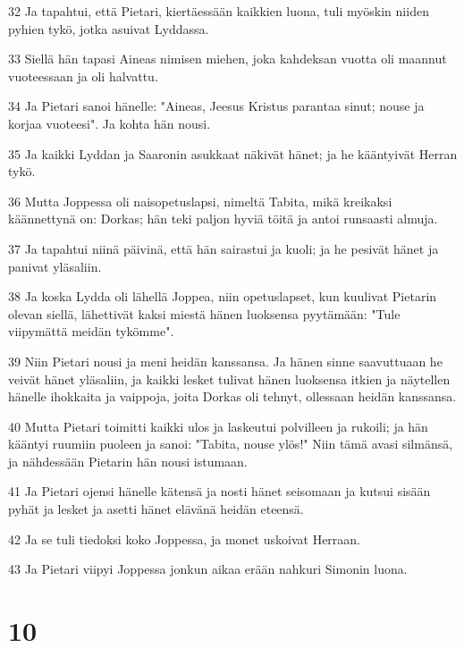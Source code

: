 \par 32 Ja tapahtui, että Pietari, kiertäessään kaikkien luona, tuli myöskin niiden pyhien tykö, jotka asuivat Lyddassa.
\par 33 Siellä hän tapasi Aineas nimisen miehen, joka kahdeksan vuotta oli maannut vuoteessaan ja oli halvattu.
\par 34 Ja Pietari sanoi hänelle: "Aineas, Jeesus Kristus parantaa sinut; nouse ja korjaa vuoteesi". Ja kohta hän nousi.
\par 35 Ja kaikki Lyddan ja Saaronin asukkaat näkivät hänet; ja he kääntyivät Herran tykö.
\par 36 Mutta Joppessa oli naisopetuslapsi, nimeltä Tabita, mikä kreikaksi käännettynä on: Dorkas; hän teki paljon hyviä töitä ja antoi runsaasti almuja.
\par 37 Ja tapahtui niinä päivinä, että hän sairastui ja kuoli; ja he pesivät hänet ja panivat yläsaliin.
\par 38 Ja koska Lydda oli lähellä Joppea, niin opetuslapset, kun kuulivat Pietarin olevan siellä, lähettivät kaksi miestä hänen luoksensa pyytämään: "Tule viipymättä meidän tykömme".
\par 39 Niin Pietari nousi ja meni heidän kanssansa. Ja hänen sinne saavuttuaan he veivät hänet yläsaliin, ja kaikki lesket tulivat hänen luoksensa itkien ja näytellen hänelle ihokkaita ja vaippoja, joita Dorkas oli tehnyt, ollessaan heidän kanssansa.
\par 40 Mutta Pietari toimitti kaikki ulos ja laskeutui polvilleen ja rukoili; ja hän kääntyi ruumiin puoleen ja sanoi: "Tabita, nouse ylös!" Niin tämä avasi silmänsä, ja nähdessään Pietarin hän nousi istumaan.
\par 41 Ja Pietari ojensi hänelle kätensä ja nosti hänet seisomaan ja kutsui sisään pyhät ja lesket ja asetti hänet elävänä heidän eteensä.
\par 42 Ja se tuli tiedoksi koko Joppessa, ja monet uskoivat Herraan.
\par 43 Ja Pietari viipyi Joppessa jonkun aikaa erään nahkuri Simonin luona.

\chapter{10}

